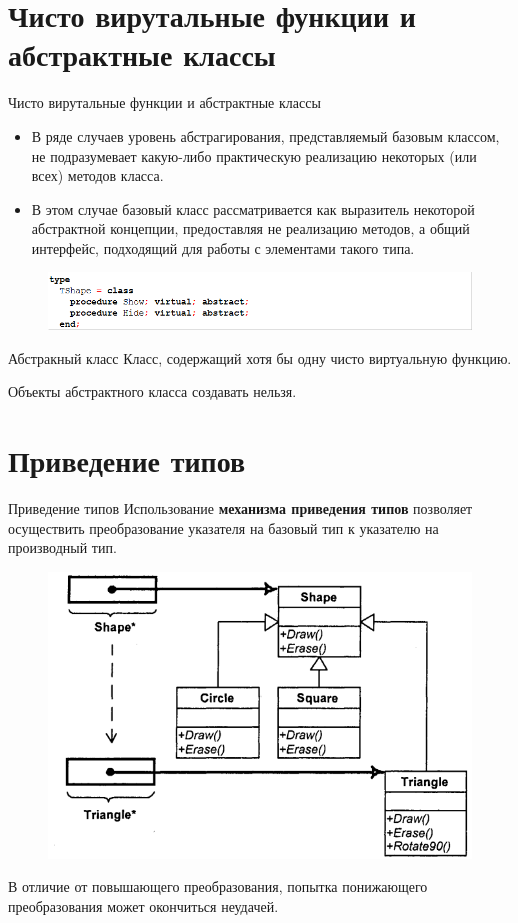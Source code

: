 \documentclass{beamer}
\begin{document}
\section{Чисто вирутальные функции и абстрактные классы}

\begin{frame}{Чисто вирутальные функции и абстрактные классы}
\begin{itemize}
\item В ряде случаев уровень абстрагирования, представляемый базовым классом,
не подразумевает какую-либо практическую реализацию некоторых (или всех) методов класса. 
\item В этом случае базовый класс рассматривается как выразитель некоторой абстрактной концепции, предоставляя не реализацию методов, а общий интерфейс, подходящий для работы с элементами такого типа.
\end{itemize}
\begin{figure}[h]
\centering
\includegraphics[scale=0.5]{images/lec07-pic12.png}
\end{figure}
\begin{block}{Абстракный класс}
Класс, содержащий хотя бы одну чисто виртуальную функцию.
\end{block}
Объекты абстрактного класса создавать нельзя.
\end{frame}

\section{Приведение типов}

\begin{frame}{Приведение типов}
Использование \textbf{механизма приведения типов} позволяет осуществить преобразование указателя на базовый тип к указателю на производный тип.
\begin{figure}[h]
\centering
\includegraphics[scale=0.5]{images/lec07-pic13.png}
\end{figure}
В отличие от повышающего преобразования, попытка понижающего преобразования может окончиться неудачей.
\end{frame}
\end{document}
